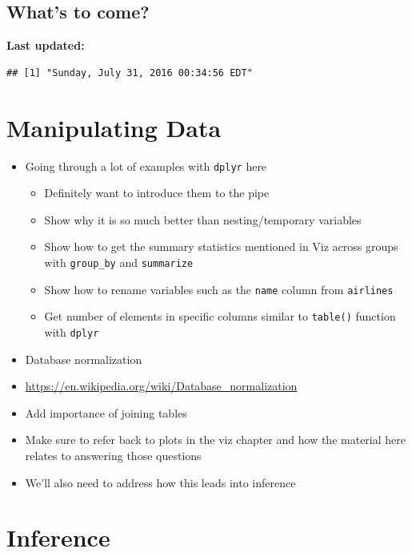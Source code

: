 \documentclass[]{tufte-book}
\providecommand{\tightlist}{%
  \setlength{\itemsep}{0pt}\setlength{\parskip}{0pt}}
\begin{document}
\section{What's to come?}\label{whats-to-come-1}

\textbf{Last updated:}

\begin{verbatim}
## [1] "Sunday, July 31, 2016 00:34:56 EDT"
\end{verbatim}

\chapter{Manipulating Data}\label{manip}

\begin{itemize}
\tightlist
\item
  Going through a lot of examples with \texttt{dplyr} here

  \begin{itemize}
  \tightlist
  \item
    Definitely want to introduce them to the pipe
  \item
    Show why it is so much better than nesting/temporary variables
  \item
    Show how to get the summary statistics mentioned in Viz across
    groups with \texttt{group\_by} and \texttt{summarize}
  \item
    Show how to rename variables such as the \texttt{name} column from
    \texttt{airlines}
  \item
    Get number of elements in specific columns similar to
    \texttt{table()} function with \texttt{dplyr}
  \end{itemize}
\item
  Database normalization
\item
  \url{https://en.wikipedia.org/wiki/Database_normalization}
\item
  Add importance of joining tables
\item
  Make sure to refer back to plots in the viz chapter and how the
  material here relates to answering those questions
\item
  We'll also need to address how this leads into inference
\end{itemize}

\chapter{Inference}\label{infer}
\end{document}
